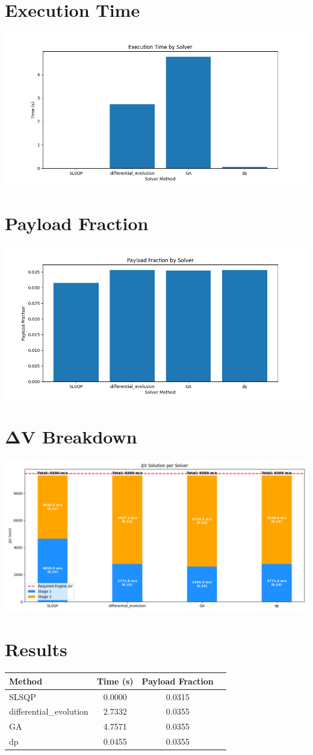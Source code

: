 \documentclass{article}
\begin{document}
\section{Execution Time}
\includegraphics[width=\textwidth]{execution_time.png}

\section{Payload Fraction}
\includegraphics[width=\textwidth]{payload_fraction.png}
                
\section{ΔV Breakdown}
\includegraphics[width=\textwidth]{dv_breakdown.png}

\section{Results}
\begin{tabular}{lccc}
\hline
Method & Time (s) & Payload Fraction \\
\hline
SLSQP & 0.0000 & 0.0315 \\
differential_evolution & 2.7332 & 0.0355 \\
GA & 4.7571 & 0.0355 \\
dp & 0.0455 & 0.0355 \\
\hline
\end{tabular}
\end{document}
